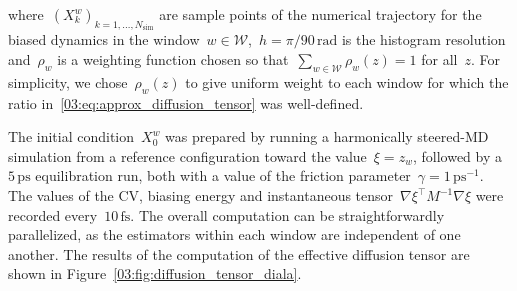 where~$(X_k^w)_{k=1,\dots,N_{\mathrm{sim}}}$ are sample points of the numerical trajectory for the biased dynamics in the window~$w\in\mathcal W$,~$h=\pi/90\,\mathrm{rad}$ is the histogram resolution and~$\rho_w$ is a weighting function chosen so that~$\sum_{w\in\mathcal W}\rho_w(z)=1$ for all~$z$. For simplicity, we chose~$\rho_w(z)$ to give uniform weight to each window for which the ratio in~\eqref{03:eq:approx_diffusion_tensor} was well-defined.

The initial condition~$X_0^w$ was prepared by running a harmonically steered-MD simulation from a reference configuration toward the value~$\xi=z_w$, followed by a~$5\,\mathrm{ps}$ equilibration run, both with a value of the friction parameter~$\gamma=1\,\mathrm{ps}^{-1}$. The values of the CV, biasing energy and instantaneous tensor~$\nabla\xi^\top M^{-1}\nabla\xi$ were recorded every~$10\,\mathrm{fs}$. The overall computation can be straightforwardly parallelized, as the estimators within each window are independent of one another.
The results of the computation of the effective diffusion tensor are shown in Figure~\ref{03:fig:diffusion_tensor_diala}.
